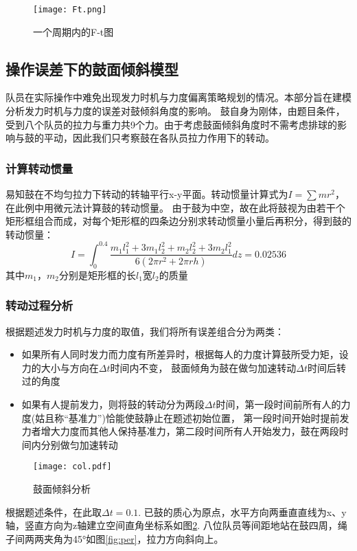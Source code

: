 \documentclass[withoutpreface,bwprint]{cumcmthesis} %
\begin{document}
\begin{figure}
	\centering
	\texttt{[image: Ft.png]}
	\caption{一个周期内的F-t图}
	\label{fig:Ft} %
\end{figure}

\subsection{操作误差下的鼓面倾斜模型}
队员在实际操作中难免出现发力时机与力度偏离策略规划的情况。本部分旨在建模分析发力时机与力度的误差对鼓倾斜角度的影响。
鼓自身为刚体，由题目条件，受到八个队员的拉力与重力共9个力。由于考虑鼓面倾斜角度时不需考虑排球的影响与鼓的平动，因此我们只考察鼓在各队员拉力作用下的转动。

\subsubsection{计算转动惯量}
易知鼓在不均匀拉力下转动的转轴平行x-y平面。转动惯量计算式为$I=\sum mr^2$，在此例中用微元法计算鼓的转动惯量。
由于鼓为中空，故在此将鼓视为由若干个矩形框组合而成，对每个矩形框的四条边分别求转动惯量小量后再积分，得到鼓的转动惯量：
$$I=\int_{0}^{0.4} \frac{m_{1}l_{1}^{2}+3m_{1}l_{2}^{2}+m_{2}l_{2}^{2}+3m_{2} l_{1}^{2}}{6(2\pi r^{2}+ 2\pi rh)}dz=0.02536$$
其中$m_1$，$m_2$分别是矩形框的长$l_1$宽$l_2$的质量

\subsubsection{转动过程分析}
根据题述发力时机与力度的取值，我们将所有误差组合分为两类：
\begin{itemize}
	\item 如果所有人同时发力而力度有所差异时，根据每人的力度计算鼓所受力矩，设力的大小与方向在$\Delta t$时间内不变，
	鼓面倾角为鼓在做匀加速转动$\Delta t$时间后转过的角度
	\item 如果有人提前发力，则将鼓的转动分为两段$\Delta t$时间，第一段时间前所有人的力度(姑且称“基准力”)恰能使鼓静止在题述初始位置，
	第一段时间开始时提前发力者增大力度而其他人保持基准力，第二段时间所有人开始发力，鼓在两段时间内分别做匀加速转动	
\end{itemize}
\begin{figure}[h]
	\centering
	\texttt{[image: col.pdf]}
	\caption{鼓面倾斜分析}
	\label{fig:col} %
\end{figure}
根据题述条件，在此取$\Delta t=0.1$. 已鼓的质心为原点，水平方向两垂直直线为x、y轴，竖直方向为z轴建立空间直角坐标系如图\ref{fig:col}.
八位队员等间距地站在鼓四周，绳子间两两夹角为45°如图\ref{fig:per}，拉力方向斜向上。
\end{document}
